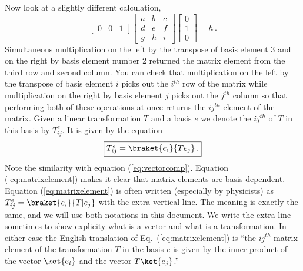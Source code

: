 Now look at a slightly different calculation,
\begin{displaymath}
  \left[ \begin{array}{ccc} 0&0&1 \end{array} \right] \left[ \begin{array}{ccc} a&b&c\\d&e&f\\g&h&i \end{array} \right] \left[ \begin{array}{c} 0\\1\\0 \end{array} \right] = h
  \, .
\end{displaymath}
Simultaneous multiplication on the left by the transpose of basis element 3 and on the right by basis element number 2 returned the matrix element from the third row and second column.
You can check that multiplication on the left by the transpose of basis element $i$ picks out the $i^{th}$ row of the matrix while multiplication on the right by basis element $j$ picks out the $j^{th}$ column so that performing both of these operations at once returns the $ij^{th}$ element of the matrix.
Given a linear transformation $T$ and a basis $e$ we denote the $ij^{th}$  of $T$ in this basis by $T^e_{ij}$.
It is given by the equation
  \begin{equation}\label{eq:matrixelement}
  \framebox{$T^e_{ij} = \braket{e_i}{Te_j} \, .$}
\end{equation}
Note the similarity with equation (\ref{eq:vectorcomp}).
Equation (\ref{eq:matrixelement}) makes it clear that matrix elements are basis dependent.
Equation (\ref{eq:matrixelement}) is often written (especially by physicists) as $T^e_{ij} = \braket{e_i}{T|e_j}$ with the extra vertical line.
The meaning is exactly the same, and we will use both notations in this document.
We write the extra line sometimes to show explicity what is a vector and what is a transformation.
In either case the English translation of Eq.~(\ref{eq:matrixelement}) is ``the $ij^{th}$ matrix element of the transformation $T$ in the basis $e$ is given by the inner product of the vector $\ket{e_i}$ and the vector $T\ket{e_j}$.''

